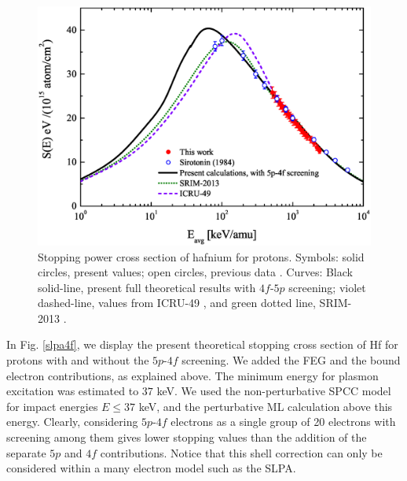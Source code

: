 \documentclass[aps,prb,reprint,groupedaddress]{revtex4-1}
\begin{document}
\begin{figure}[!t]
\centering
\includegraphics[width=13.0cm]{Fig03.eps}
\caption{Stopping power cross section of hafnium for protons. Symbols: solid circles, present values; open circles, previous data \cite{Sirotinin}. Curves: Black solid-line, present full theoretical results with $4f$-$5p$ screening; violet dashed-line, values from ICRU-49 \cite{ICRU49}, and green dotted line, SRIM-2013 \cite{Ziegler01}.}
\label{F03}
\end{figure}

In Fig. \ref{slpa4f}, we display the present theoretical stopping cross section of Hf for protons with and without the $5p$-$4f$ screening. We added the FEG and the bound electron contributions, as explained above. The minimum energy for plasmon excitation was estimated to $37$ keV. We used the non-perturbative SPCC model for impact energies $E \leq 37$ keV, and the perturbative ML calculation above this energy. %
Clearly, considering $5p$-$4f$ electrons as a single group of 20 electrons with screening among them gives lower stopping values than the addition of the separate $5p$ and $4f$ contributions. Notice that this shell correction can only be considered within a many electron model such as the SLPA.
\end{document}
